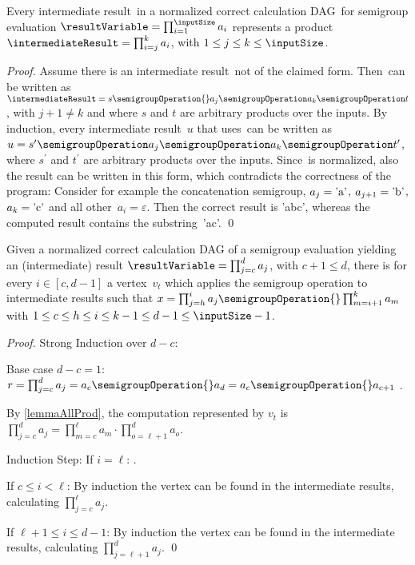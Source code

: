 \documentclass[envcountsame]{llncs}
\begin{document}
\begin{lemma}
\label{lemmaAllProd}
Every intermediate result~\intermediateResult in a normalized correct calculation DAG~\calculationDAG for semigroup evaluation $\resultVariable=\prod_{i=1}^{\inputSize}a_i$ represents a product $\intermediateResult=\prod_{i=j}^{k}a_i$, with $1\leq j \leq k \leq \inputSize$.
\end{lemma}

\begin{proof}
Assume there is an intermediate result~\intermediateResult not of the claimed form.
Then~\intermediateResult can be written as $\intermediateResult=s\semigroupOperation{}a_j\semigroupOperation a_k\semigroupOperation t$, with $j+1 \neq k$ and where $s$ and $t$ are arbitrary products over the inputs.
By induction, every intermediate result~$u$ that uses~\intermediateResult can be written as $u = s^{\prime}\semigroupOperation a_j\semigroupOperation a_k\semigroupOperation t^{\prime}$, where $s^{\prime}$ and $t^{\prime}$ are arbitrary products over the inputs.
Since~\calculationDAG is normalized, also the result can be written in this form, which contradicts the correctness of the program:
Consider for example the concatenation semigroup, $a_j=\hbox{'a'}$, $a_{j+1}=\hbox{'b'}$, $a_k=\hbox{'c'}$ and all other~$a_i=\varepsilon$.
Then the correct result is 'abc', whereas the computed result contains the substring~'ac'.
\qed
\end{proof}


\begin{lemma}
\label{lemmaEverySemigroupOperation}
Given a normalized correct calculation DAG of a semigroup evaluation yielding an (intermediate) result $\resultVariable=\prod_{j=c}^{d}a_{j}$, with $c+1\leq d$, there is for every $i\in [c,d-1]$ a vertex~$v_t$ which applies the semigroup operation to intermediate results such that $x=\prod_{j=h}^{i}a_j\semigroupOperation{}\prod_{m=i+1}^{k}a_m$ with $1\leq c\leq h\leq i \leq k -1 \leq d-1\leq \inputSize -1$.
\end{lemma}
\begin{proof}
Strong Induction over $d-c$:

Base case $d-c=1$: $r=\prod_{j=c}^{d}a_{j} = a_{c}\semigroupOperation{}a_{d}= a_c \semigroupOperation{} a_{c+1}$ . \checkmark

By \autoref{lemmaAllProd}, the computation represented by $v_t$ is $\prod_{j=c}^{d}a_{j}=\prod_{m=c}^{\ell}a_{m} \cdot \prod_{o=\ell+1}^{d}a_{o}$.

Induction Step: 
If $i=\ell$: \checkmark.

If $c\leq i < \ell$: By induction the vertex can be found in the intermediate results, calculating $\prod_{j=c}^{\ell}a_{j}$. \checkmark


If $\ell +1 \leq i\leq d-1$: By induction the vertex can be found in the intermediate results, calculating $\prod_{j=\ell+1}^{d}a_{j}$. \checkmark
\qed
\end{proof}
\end{document}
